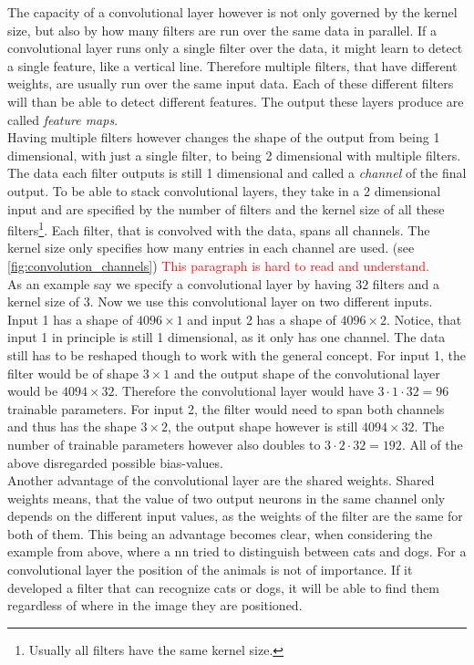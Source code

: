 The capacity of a convolutional layer however is not only governed by the kernel size, but also by how many filters are run over the same data in parallel. If a convolutional layer runs only a single filter over the data, it might learn to detect a single feature, like a vertical line. Therefore multiple filters, that have different weights, are usually run over the same input data. Each of these different filters will than be able to detect different features. The output these layers produce are called \emph{feature maps}.\\
Having multiple filters however changes the shape of the output from being 1 dimensional, with just a single filter, to being 2 dimensional with multiple filters. The data each filter outputs is still 1 dimensional and called a \emph{channel} of the final output. To be able to stack convolutional layers, they take in a 2 dimensional input and are specified by the number of filters and the kernel size of all these filters\footnote{Usually all filters have the same kernel size.}. Each filter, that is convolved with the data, spans all channels. The kernel size only specifies how many entries in each channel are used. (see \autoref{fig:convolution_channels}) \textcolor{red}{This paragraph is hard to read and understand.}\\
As an example say we specify a convolutional layer by having $32$ filters and a kernel size of $3$. Now we use this convolutional layer on two different inputs. Input 1 has a shape of $4096\times 1$ and input 2 has a shape of $4096\times 2$. Notice, that input 1 in principle is still 1 dimensional, as it only has one channel. The data still has to be reshaped though to work with the general concept. For input 1, the filter would be of shape $3\times 1$ and the output shape of the convolutional layer would be $4094\times 32$. Therefore the convolutional layer would have $3\cdot 1\cdot 32=96$ trainable parameters. For input 2, the filter would need to span both channels and thus has the shape $3\times 2$, the output shape however is still $4094\times 32$. The number of trainable parameters however also doubles to $3\cdot 2\cdot 32=192$. All of the above disregarded possible bias-values.\medskip\\
Another advantage of the convolutional layer are the shared weights. Shared weights means, that the value of two output neurons in the same channel only depends on the different input values, as the weights of the filter are the same for both of them. This being an advantage becomes clear, when considering the example from above, where a \gls{nn} tried to distinguish between cats and dogs. For a convolutional layer the position of the animals is not of importance. If it developed a filter that can recognize cats or dogs, it will be able to find them regardless of where in the image they are positioned.\\
